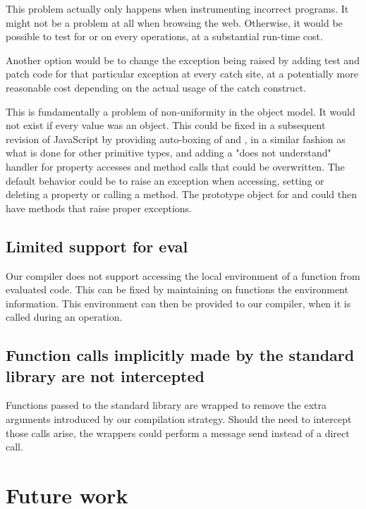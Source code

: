 This problem actually only happens when instrumenting incorrect programs. It
might not be a problem at all when browsing the web. Otherwise, it would be
possible to test for  or  on every operations, at a
substantial run-time cost.

Another option would be to change the exception being raised by adding test and
patch code for that particular exception at every catch site, at a
potentially more reasonable cost depending on the actual usage of the catch
construct.

This is fundamentally a problem of non-uniformity in the object model. It would
not exist if every value was an object.  This could be fixed in a subsequent
revision of JavaScript by providing auto-boxing of  and
, in a similar fashion as what is done for other primitive types,
and adding a "does not understand" handler for property accesses and method
calls that could be overwritten. The default behavior could be to raise an
exception when accessing, setting or deleting a property or calling a method.
The prototype object for  and  could then have methods that
raise proper exceptions.

\subsection{Limited support for eval}

Our compiler does not support accessing the local environment of a function
from evaluated code. This can be fixed by maintaining on functions the
environment information. This environment can then be provided to our compiler,
when it is called during an  operation.

\subsection{Function calls implicitly made by the standard library are not intercepted}

Functions passed to the standard library are wrapped to remove the extra
arguments introduced by our compilation strategy. Should the need to intercept
those calls arise, the wrappers could perform a message send instead of a
direct call.
 
\section{Future work}

